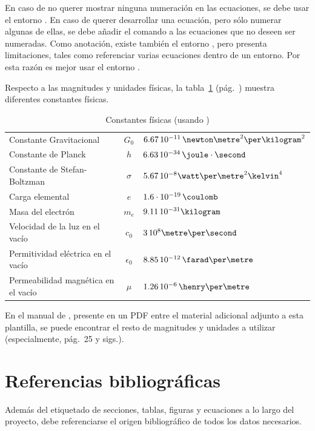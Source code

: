 En caso de no querer mostrar ninguna numeración en las ecuaciones, se debe usar el entorno . En caso de querer desarrollar una ecuación, pero sólo numerar algunas de ellas, se debe añadir el comando  a las ecuaciones que no deseen ser numeradas. Como anotación, existe también el entorno , pero presenta limitaciones, tales como referenciar varias ecuaciones dentro de un entorno. Por esta razón es mejor usar el entorno .

Respecto a las magnitudes y unidades físicas, la tabla~\ref{tab:ctes} (pág.~\pageref{tab:ctes}) muestra diferentes constantes físicas.

\begin{table}[h]
\centering
\begin{tabular}{p{8cm}cp{3cm}}
	\hline
	Constante Gravitacional & $G_0$ & $6.67 \, 10^{-11} \, \newton\metre^2\per\kilogram^2$\\
	Constante de Planck & $h$ & $6.63 \, 10^{-34} \, \joule\cdot\second$\\
	Constante de Stefan-Boltzman & $\sigma$ & $5.67 \, 10^{-8} \watt\per\metre^2\kelvin^4$\\
	Carga elemental & $e$ & $1.6 \cdot 10^{-19} \, \coulomb$\\
	Masa del electrón & $m_e$ & $9.11 \, 10^{-31} \kilogram$\\
	Velocidad de la luz en el vacío & $c_0$ & $3 \, 10^8 \metre\per\second$ \\
	Permitividad eléctrica en el vacío & $\epsilon_0$ & $8.85 \, 10^{-12} \, \farad\per\metre$\\
	Permeabilidad magnética en el vacío & $\mu$ & $1.26 \, 10^{-6} \, \henry\per\metre$\\
	\hline
\end{tabular}
	\caption{Constantes físicas (usando )}
	\label{tab:ctes}
\end{table}

En el manual de , presente en un PDF entre el material adicional adjunto a esta plantilla, se puede encontrar el resto de magnitudes y unidades a utilizar (especialmente, pág.~25 y sigs.).

\section{Referencias bibliográficas}

Además del etiquetado de secciones, tablas, figuras y ecuaciones a lo largo del proyecto, debe referenciarse el origen bibliográfico de todos los datos necesarios.

